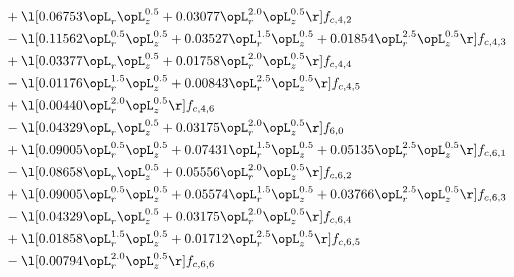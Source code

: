 \begin{alignat}{2}
& + \l[  0.06753 \opL_r \opL_z^{0.5} +  0.03077 \opL_r^{2.0} \opL_z^{0.5}  \r] f_{c,4,2} \nonumber \\ 
& - \l[  0.11562 \opL_r^{0.5} \opL_z^{0.5} +  0.03527 \opL_r^{1.5} \opL_z^{0.5} +  0.01854 \opL_r^{2.5} \opL_z^{0.5}  \r] f_{c,4,3} \nonumber \\ 
& + \l[  0.03377 \opL_r \opL_z^{0.5} +  0.01758 \opL_r^{2.0} \opL_z^{0.5}  \r] f_{c,4,4} \nonumber \\ 
& - \l[  0.01176 \opL_r^{1.5} \opL_z^{0.5} +  0.00843 \opL_r^{2.5} \opL_z^{0.5}  \r] f_{c,4,5} \nonumber \\ 
& + \l[  0.00440 \opL_r^{2.0} \opL_z^{0.5}  \r] f_{c,4,6} \nonumber \\ 
& - \l[  0.04329 \opL_r \opL_z^{0.5} +  0.03175 \opL_r^{2.0} \opL_z^{0.5}  \r] f_{6,0} \nonumber \\ 
& + \l[  0.09005 \opL_r^{0.5} \opL_z^{0.5} +  0.07431 \opL_r^{1.5} \opL_z^{0.5} +  0.05135 \opL_r^{2.5} \opL_z^{0.5}  \r] f_{c,6,1} \nonumber \\ 
& - \l[  0.08658 \opL_r \opL_z^{0.5} +  0.05556 \opL_r^{2.0} \opL_z^{0.5}  \r] f_{c,6,2} \nonumber \\ 
& + \l[  0.09005 \opL_r^{0.5} \opL_z^{0.5} +  0.05574 \opL_r^{1.5} \opL_z^{0.5} +  0.03766 \opL_r^{2.5} \opL_z^{0.5}  \r] f_{c,6,3} \nonumber \\ 
& - \l[  0.04329 \opL_r \opL_z^{0.5} +  0.03175 \opL_r^{2.0} \opL_z^{0.5}  \r] f_{c,6,4} \nonumber \\ 
& + \l[  0.01858 \opL_r^{1.5} \opL_z^{0.5} +  0.01712 \opL_r^{2.5} \opL_z^{0.5}  \r] f_{c,6,5} \nonumber \\ 
& - \l[  0.00794 \opL_r^{2.0} \opL_z^{0.5}  \r] f_{c,6,6} \nonumber \\ 
\end{alignat} 


